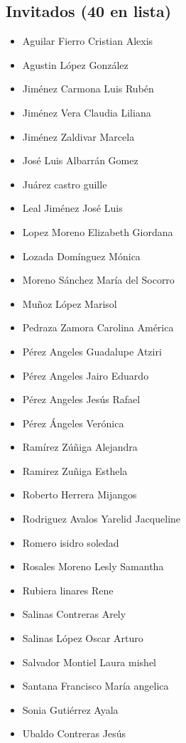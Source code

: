 \begin{spacing}{0.5}
\section*{Invitados (40 en lista)}
\begin{paracol}{2}
\begin{itemize}
\item Aguilar Fierro Cristian Alexis
\item Agustin López González
\item Jiménez Carmona Luis Rubén
\item Jiménez Vera Claudia Liliana
\item Jiménez Zaldivar Marcela
\item José Luis Albarrán Gomez
\item Juárez castro guille
\item Leal Jiménez José Luis
\item Lopez Moreno Elizabeth Giordana
\item Lozada Domínguez Mónica
\item Moreno Sánchez María del Socorro
\item Muñoz López Marisol
\item Pedraza Zamora Carolina América
\item Pérez Angeles Guadalupe Atziri
\item Pérez Angeles Jairo Eduardo
\item Pérez Angeles Jesús Rafael
\item Pérez Ángeles Verónica
\item Ramírez Zúñiga Alejandra
\item Ramirez Zuñiga Esthela
\item Roberto Herrera Mijangos
\end{itemize}
\switchcolumn
\begin{itemize}
\item Rodriguez Avalos Yarelid Jacqueline
\item Romero isidro soledad
\item Rosales Moreno Lesly Samantha
\item Rubiera linares Rene
\item Salinas Contreras Arely
\item Salinas López Oscar Arturo
\item Salvador Montiel Laura mishel
\item Santana Francisco María angelica
\item Sonia Gutiérrez Ayala
\item Ubaldo Contreras Jesús

\end{itemize}
\end{paracol}
\end{spacing}
